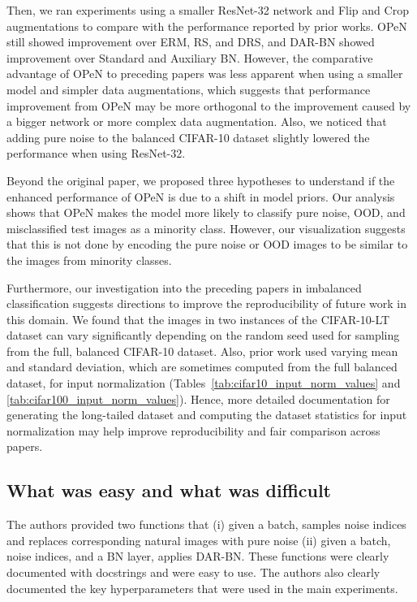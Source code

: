 Then, we ran experiments using a smaller ResNet-32 network and Flip and Crop augmentations to compare with the performance reported by prior works. OPeN still showed improvement over ERM, RS, and DRS, and DAR-BN showed improvement over Standard and Auxiliary BN. However, the comparative advantage of OPeN to preceding papers was less apparent when using a smaller model and simpler data augmentations, which suggests that performance improvement from OPeN may be more orthogonal to the improvement caused by a bigger network or more complex data augmentation. Also, we noticed that adding pure noise to the balanced CIFAR-10 dataset slightly lowered the performance when using ResNet-32.

Beyond the original paper, we proposed three hypotheses to understand if the enhanced performance of OPeN is due to a shift in model priors. Our analysis shows that OPeN makes the model more likely to classify pure noise, OOD, and misclassified test images as a minority class. However, our visualization suggests that this is not done by encoding the pure noise or OOD images to be similar to the images from minority classes.

Furthermore, our investigation into the preceding papers in imbalanced classification suggests directions to improve the reproducibility of future work in this domain. We found that the images in two instances of the CIFAR-10-LT dataset can vary significantly depending on the random seed used for sampling from the full, balanced CIFAR-10 dataset. Also, prior work used varying mean and standard deviation, which are sometimes computed from the full balanced dataset, for input normalization (Tables~\ref{tab:cifar10_input_norm_values} and \ref{tab:cifar100_input_norm_values}). Hence, more detailed documentation for generating the long-tailed dataset and computing the dataset statistics for input normalization may help improve reproducibility and fair comparison across papers.

\subsection{What was easy and what was difficult}
The authors provided two functions that (i) given a batch, samples noise indices and replaces corresponding natural images with pure noise (ii) given a batch, noise indices, and a BN layer, applies DAR-BN. These functions were clearly documented with docstrings and were easy to use. The authors also clearly documented the key hyperparameters that were used in the main experiments.

